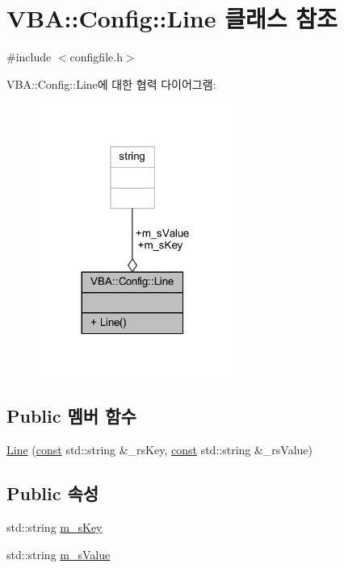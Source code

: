 \hypertarget{class_v_b_a_1_1_config_1_1_line}{}\section{V\+BA\+:\+:Config\+:\+:Line 클래스 참조}
\label{class_v_b_a_1_1_config_1_1_line}


{\ttfamily \#include $<$configfile.\+h$>$}



V\+BA\+:\+:Config\+:\+:Line에 대한 협력 다이어그램\+:\nopagebreak
\begin{figure}[H]
\begin{center}
\leavevmode
\includegraphics[width=180pt]{class_v_b_a_1_1_config_1_1_line__coll__graph}
\end{center}
\end{figure}
\subsection*{Public 멤버 함수}
\begin{DoxyCompactItemize}
\item 
\mbox{\hyperlink{class_v_b_a_1_1_config_1_1_line_a79482ad95747330d0b31e862410a2e41}{Line}} (\mbox{\hyperlink{getopt1_8c_a2c212835823e3c54a8ab6d95c652660e}{const}} std\+::string \&\+\_\+rs\+Key, \mbox{\hyperlink{getopt1_8c_a2c212835823e3c54a8ab6d95c652660e}{const}} std\+::string \&\+\_\+rs\+Value)
\end{DoxyCompactItemize}
\subsection*{Public 속성}
\begin{DoxyCompactItemize}
\item 
std\+::string \mbox{\hyperlink{class_v_b_a_1_1_config_1_1_line_a24c2691b23a1e55614f5c7f493199fa0}{m\+\_\+s\+Key}}
\item 
std\+::string \mbox{\hyperlink{class_v_b_a_1_1_config_1_1_line_a49ce629848d486c0a3f0ee4e5d7d015a}{m\+\_\+s\+Value}}
\end{DoxyCompactItemize}


